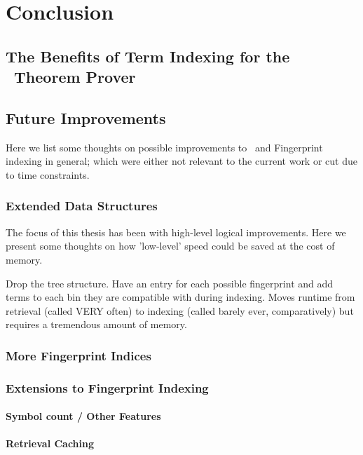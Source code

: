 
\chapter{Conclusion}
\label{cha:conclusion}

\section{The Benefits of Term Indexing for the \Beagle\ Theorem Prover }
\label{sec:why}

\section{Future Improvements}
\label{sec:future}

Here we list some thoughts on possible improvements to \beagle\ and Fingerprint
indexing in general; which were either not relevant to the current work or
cut due to time constraints.

\subsection{Extended Data Structures}
The focus of this thesis has been with high-level logical improvements. Here
we present some thoughts on how 'low-level' speed could be saved at the cost of memory.

Drop the tree structure. Have an entry for each possible fingerprint and add terms
to each bin they are compatible with during indexing. Moves runtime from
retrieval (called VERY often) to indexing (called barely ever, comparatively) but requires a
tremendous amount of memory.

\subsection{More Fingerprint Indices}

\subsection{Extensions to Fingerprint Indexing}

\subsubsection{Symbol count / Other Features}
\subsubsection{Retrieval Caching}
